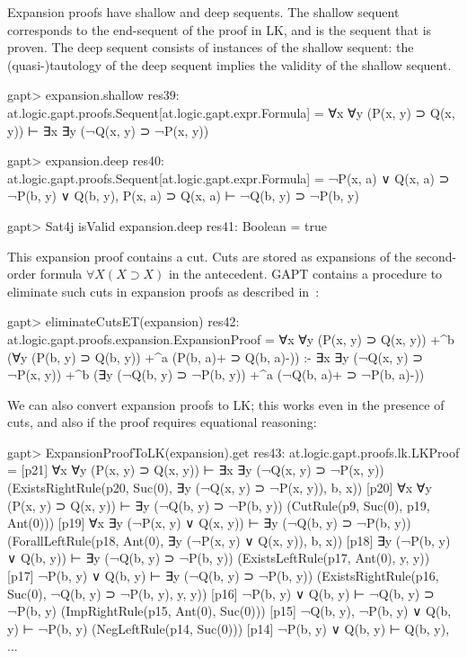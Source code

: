 \documentclass[a4paper,11pt]{article}
\newcommand{\impl}{\supset} %
\begin{document}
Expansion proofs have shallow and deep sequents.  The shallow sequent
corresponds to the end-sequent of the proof in LK, and is the sequent that is
proven.  The deep sequent consists of instances of the shallow sequent: the
(quasi-)tautology of the deep sequent implies the validity of the shallow
sequent.
\begin{clilisting}
gapt> expansion.shallow
res39: at.logic.gapt.proofs.Sequent[at.logic.gapt.expr.Formula] = ∀x ∀y (P(x, y) ⊃ Q(x, y)) ⊢ ∃x ∃y (¬Q(x, y) ⊃ ¬P(x, y))

gapt> expansion.deep
res40: at.logic.gapt.proofs.Sequent[at.logic.gapt.expr.Formula] =
¬P(x, a) ∨ Q(x, a) ⊃ ¬P(b, y) ∨ Q(b, y),
P(x, a) ⊃ Q(x, a)
⊢
¬Q(b, y) ⊃ ¬P(b, y)

gapt> Sat4j isValid expansion.deep
res41: Boolean = true

\end{clilisting}

This expansion proof contains a cut.  Cuts are stored as expansions of the
second-order formula $\forall X (X \impl X)$ in the antecedent.  GAPT contains
a procedure to eliminate such cuts in expansion proofs as described
in~\cite{Hetzl2013Expansion}:
\begin{clilisting}
gapt> eliminateCutsET(expansion)
res42: at.logic.gapt.proofs.expansion.ExpansionProof =
∀x ∀y (P(x, y) ⊃ Q(x, y))
  +^{b} (∀y (P(b, y) ⊃ Q(b, y)) +^{a} (P(b, a)+ ⊃ Q(b, a)-))
:-
∃x ∃y (¬Q(x, y) ⊃ ¬P(x, y))
  +^{b} (∃y (¬Q(b, y) ⊃ ¬P(b, y)) +^{a} (¬Q(b, a)+ ⊃ ¬P(b, a)-))

\end{clilisting}

We can also convert expansion proofs to LK; this works even in the presence of
cuts, and also if the proof requires equational reasoning:
\begin{clilisting}
gapt> ExpansionProofToLK(expansion).get
res43: at.logic.gapt.proofs.lk.LKProof =
[p21] ∀x ∀y (P(x, y) ⊃ Q(x, y)) ⊢ ∃x ∃y (¬Q(x, y) ⊃ ¬P(x, y))    (ExistsRightRule(p20, Suc(0), ∃y (¬Q(x, y) ⊃ ¬P(x, y)), b, x))
[p20] ∀x ∀y (P(x, y) ⊃ Q(x, y)) ⊢ ∃y (¬Q(b, y) ⊃ ¬P(b, y))    (CutRule(p9, Suc(0), p19, Ant(0)))
[p19] ∀x ∃y (¬P(x, y) ∨ Q(x, y)) ⊢ ∃y (¬Q(b, y) ⊃ ¬P(b, y))    (ForallLeftRule(p18, Ant(0), ∃y (¬P(x, y) ∨ Q(x, y)), b, x))
[p18] ∃y (¬P(b, y) ∨ Q(b, y)) ⊢ ∃y (¬Q(b, y) ⊃ ¬P(b, y))    (ExistsLeftRule(p17, Ant(0), y, y))
[p17] ¬P(b, y) ∨ Q(b, y) ⊢ ∃y (¬Q(b, y) ⊃ ¬P(b, y))    (ExistsRightRule(p16, Suc(0), ¬Q(b, y) ⊃ ¬P(b, y), y, y))
[p16] ¬P(b, y) ∨ Q(b, y) ⊢ ¬Q(b, y) ⊃ ¬P(b, y)    (ImpRightRule(p15, Ant(0), Suc(0)))
[p15] ¬Q(b, y), ¬P(b, y) ∨ Q(b, y) ⊢ ¬P(b, y)    (NegLeftRule(p14, Suc(0)))
[p14] ¬P(b, y) ∨ Q(b, y) ⊢ Q(b, y), ...
\end{clilisting}
\end{document}
